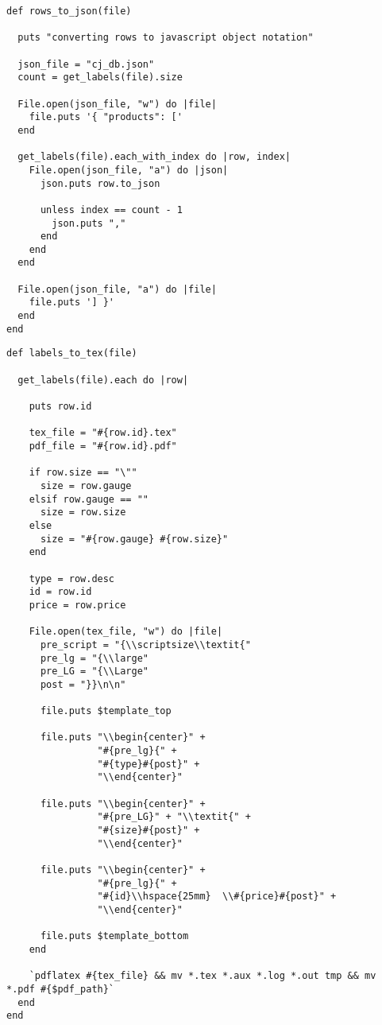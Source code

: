 \documentclass[11pt]{article}
\begin{document}
\begin{verbatim}
def rows_to_json(file)

  puts "converting rows to javascript object notation"

  json_file = "cj_db.json"
  count = get_labels(file).size

  File.open(json_file, "w") do |file|
    file.puts '{ "products": ['
  end

  get_labels(file).each_with_index do |row, index|
    File.open(json_file, "a") do |json|
      json.puts row.to_json

      unless index == count - 1
        json.puts ","
      end
    end
  end

  File.open(json_file, "a") do |file|
    file.puts '] }'
  end
end
\end{verbatim}

\begin{verbatim}
def labels_to_tex(file)

  get_labels(file).each do |row|

    puts row.id

    tex_file = "#{row.id}.tex"
    pdf_file = "#{row.id}.pdf"

    if row.size == "\""
      size = row.gauge
    elsif row.gauge == ""
      size = row.size
    else
      size = "#{row.gauge} #{row.size}"
    end

    type = row.desc
    id = row.id
    price = row.price

    File.open(tex_file, "w") do |file|
      pre_script = "{\\scriptsize\\textit{"
      pre_lg = "{\\large"
      pre_LG = "{\\Large"
      post = "}}\n\n"

      file.puts $template_top

      file.puts "\\begin{center}" +
                "#{pre_lg}{" +
                "#{type}#{post}" +
                "\\end{center}"

      file.puts "\\begin{center}" +
                "#{pre_LG}" + "\\textit{" +
                "#{size}#{post}" +
                "\\end{center}"

      file.puts "\\begin{center}" +
                "#{pre_lg}{" +
                "#{id}\\hspace{25mm}  \\#{price}#{post}" +
                "\\end{center}"

      file.puts $template_bottom
    end

    `pdflatex #{tex_file} && mv *.tex *.aux *.log *.out tmp && mv *.pdf #{$pdf_path}`
  end
end
\end{verbatim}
\end{document}
